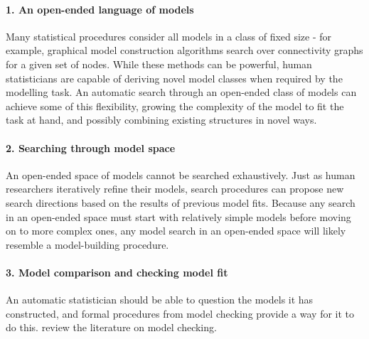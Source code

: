 \documentclass[letterpaper]{article}
\begin{document}
\paragraph{1. An open-ended language of models}
Many statistical procedures consider all models in a class of fixed size - for example, graphical model construction algorithms search over connectivity graphs for a given set of nodes.
While these methods can be powerful, human statisticians are capable of deriving novel model classes when required by the modelling task.
An automatic search through an open-ended class of models can achieve some of this flexibility, growing the complexity of the model to fit the task at hand, and possibly combining existing structures in novel ways.

\paragraph{2. Searching through model space}
An open-ended space of models cannot be searched exhaustively.
Just as human researchers iteratively refine their models, search procedures can propose new search directions based on the results of previous model fits.
Because any search in an open-ended space must start with relatively simple models before moving on to more complex ones, any model search in an open-ended space will likely resemble a model-building procedure.%

\paragraph{3. Model comparison and checking model fit}
An automatic statistician should be able to question the models it has constructed, and formal procedures from model checking provide a way for it to do this.
\citet{gelman2012philosophy} review the literature on model checking.
\end{document}
